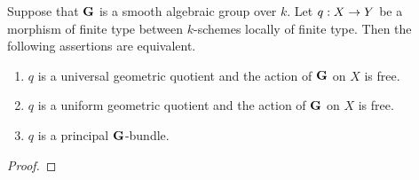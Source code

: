 \begin{theorem}\label{theorem:principal_bundles_and_free_actions}
Suppose that $\mathbf{G}$ is a smooth algebraic group over $k$. Let $q:X\rightarrow Y$ be a morphism of finite type between $k$-schemes locally of finite type. Then the following assertions are equivalent.
\begin{enumerate}[label=\emph{\textbf{(\roman*)}}, leftmargin=3.0em]
\item $q$ is a universal geometric quotient and the action of $\mathbf{G}$ on $X$ is free.
\item $q$ is a uniform geometric quotient and the action of $\mathbf{G}$ on $X$ is free.
\item $q$ is a principal $\mathbf{G}$-bundle.
\end{enumerate}
\end{theorem}
\begin{proof}

\end{proof}
